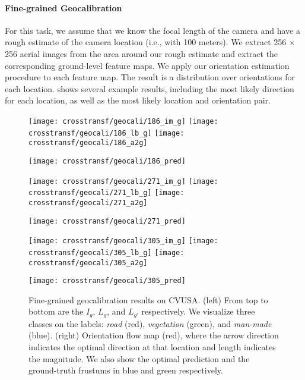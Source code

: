 \paragraph{Fine-grained Geocalibration}

For this task, we assume that we know the focal length of the camera
and have a rough estimate of the camera location (i.e., with 100
meters).  We extract 256 $\times$ 256 aerial images from the area
around our rough estimate and extract the corresponding ground-level
feature maps.  We apply our orientation estimation procedure to each
feature map.  The result is a distribution over orientations for each
location.   shows several example results,
including the most likely direction for each location, as well as the
most likely location and orientation pair.

\begin{figure*}
  \setlength{\aheight}{80pt}
  \setlength{\gwidth}{52pt}
  \centering
  \begin{minipage}[b]{\gwidth}
  \texttt{[image: crosstransf/geocali/186\_im\_g]}
  \texttt{[image: crosstransf/geocali/186\_lb\_g]}
  \texttt{[image: crosstransf/geocali/186\_a2g]}
  \end{minipage}
  \texttt{[image: crosstransf/geocali/186\_pred]}
  \hfill
  \begin{minipage}[b]{\gwidth}
  \texttt{[image: crosstransf/geocali/271\_im\_g]}
  \texttt{[image: crosstransf/geocali/271\_lb\_g]}
  \texttt{[image: crosstransf/geocali/271\_a2g]}
  \end{minipage}
  \texttt{[image: crosstransf/geocali/271\_pred]}
  \hfill
  \begin{minipage}[b]{\gwidth}
  \texttt{[image: crosstransf/geocali/305\_im\_g]}
  \texttt{[image: crosstransf/geocali/305\_lb\_g]}
  \texttt{[image: crosstransf/geocali/305\_a2g]}
  \end{minipage}
  \texttt{[image: crosstransf/geocali/305\_pred]}
  \hfill

  \caption{Fine-grained geocalibration results on CVUSA. (left) From
top to bottom are the $I_g$, $L_g$, and $L_{g'}$ respectively.  We
visualize three classes on the labels: {\em road} (red), {\em
vegetation} (green), and {\em man-made} (blue).  (right) Orientation
flow map (red), where the arrow direction indicates the optimal
direction at that location and length indicates the magnitude. We also
show the optimal prediction and the ground-truth frustums in blue and
green respectively.}
  \label{fig:geocali:cali}
\end{figure*}

